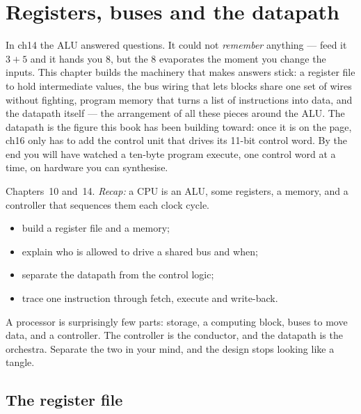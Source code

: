 \chapter{Registers, buses and the datapath}\label{ch:datapath}

In ch14 the ALU answered questions. It could not \emph{remember}
anything --- feed it $3+5$ and it hands you 8, but the 8 evaporates the
moment you change the inputs. This chapter builds the machinery that
makes answers stick: a register file to hold intermediate values, the
bus wiring that lets blocks share one set of wires without fighting,
program memory that turns a list of instructions into data, and the
datapath itself --- the arrangement of all these pieces around the ALU.
The datapath is the figure this book has been building toward: once it
is on the page, ch16 only has to add the control unit that drives its
11-bit control word. By the end you will have watched a ten-byte
program execute, one control word at a time, on hardware you can
synthesise.

\begin{rulebox}
Chapters~10 and~14. \emph{Recap:} a CPU is an ALU, some registers, a memory, and a controller that sequences them each clock cycle.
\end{rulebox}
\begin{wins}
\begin{itemize}
\item build a register file and a memory;
\item explain who is allowed to drive a shared bus and when;
\item separate the datapath from the control logic;
\item trace one instruction through fetch, execute and write-back.
\end{itemize}
\end{wins}
\begin{principle}
A processor is surprisingly few parts: storage, a computing block, buses to move data, and a controller. The controller is the conductor, and the datapath is the orchestra. Separate the two in your mind, and the design stops looking like a tangle.
\end{principle}

\section{The register file}\label{sec:regfile15}

